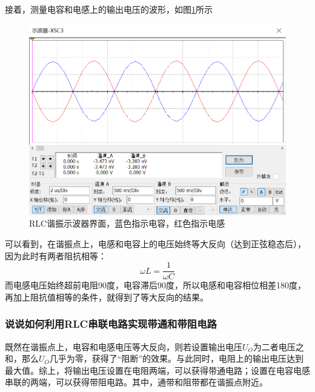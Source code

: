 \documentclass{ctexart}
\begin{document}
接着，测量电容和电感上的输出电压的波形，如图\ref{fig:RLC谐振示波器界面}所示
\begin{figure}[h]
    \centering
    \includegraphics[scale=0.5]{pic/RLC谐振示波器.png}
    \caption{RLC谐振示波器界面，蓝色指示电容，红色指示电感}
    \label{fig:RLC谐振示波器界面}
\end{figure}
可以看到，在谐振点上，电感和电容上的电压始终等大反向（达到正弦稳态后），因为此时有两者阻抗相等：
\begin{equation}
    \omega L =\dfrac{1}{\omega C} 
\end{equation}
而电感电压始终超前电阻90度，电容滞后90度，所以电感和电容相位相差180度，再加上阻抗值相等的条件，就得到了等大反向的结果。
\subsubsection{说说如何利用RLC串联电路实现带通和带阻电路}
既然在谐振点上，电容和电感电压等大反向，则若设置输出电压$U_O$为二者电压之和，那么$U_O$几乎为零，获得了“阻断”的效果。与此同时，电阻上的输出电压达到最大值。综上，将输出电压设置在电阻两端，可以获得带通电路；设置在电容电感串联的两端，可以获得带阻电路。其中，通带和阻带都在谐振点附近。
\end{document}
